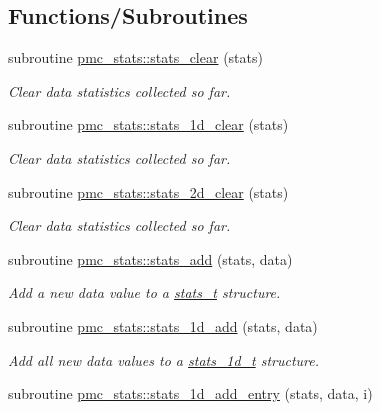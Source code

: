 \subsection*{Functions/\+Subroutines}
\begin{DoxyCompactItemize}
\item 
subroutine \mbox{\hyperlink{namespacepmc__stats_ac5750dcd5d754124f53223d4072344c1}{pmc\+\_\+stats\+::stats\+\_\+clear}} (stats)
\begin{DoxyCompactList}\small\item\em Clear data statistics collected so far. \end{DoxyCompactList}\item 
subroutine \mbox{\hyperlink{namespacepmc__stats_ac0cd9c69e90ebd760939ce802a889f94}{pmc\+\_\+stats\+::stats\+\_\+1d\+\_\+clear}} (stats)
\begin{DoxyCompactList}\small\item\em Clear data statistics collected so far. \end{DoxyCompactList}\item 
subroutine \mbox{\hyperlink{namespacepmc__stats_a4416bf7fadf595f6954554bcda94f144}{pmc\+\_\+stats\+::stats\+\_\+2d\+\_\+clear}} (stats)
\begin{DoxyCompactList}\small\item\em Clear data statistics collected so far. \end{DoxyCompactList}\item 
subroutine \mbox{\hyperlink{namespacepmc__stats_a09e09f5a5169acdc4fbeb28b83586fa5}{pmc\+\_\+stats\+::stats\+\_\+add}} (stats, data)
\begin{DoxyCompactList}\small\item\em Add a new data value to a {\ttfamily \mbox{\hyperlink{structpmc__stats_1_1stats__t}{stats\+\_\+t}}} structure. \end{DoxyCompactList}\item 
subroutine \mbox{\hyperlink{namespacepmc__stats_a39445eed819e5c2e7fdd867855e23fc6}{pmc\+\_\+stats\+::stats\+\_\+1d\+\_\+add}} (stats, data)
\begin{DoxyCompactList}\small\item\em Add all new data values to a {\ttfamily \mbox{\hyperlink{structpmc__stats_1_1stats__1d__t}{stats\+\_\+1d\+\_\+t}}} structure. \end{DoxyCompactList}\item 
subroutine \mbox{\hyperlink{namespacepmc__stats_a4e469252e2fa292137c09f0a86fcafc7}{pmc\+\_\+stats\+::stats\+\_\+1d\+\_\+add\+\_\+entry}} (stats, data, i)

\end{DoxyCompactItemize}
